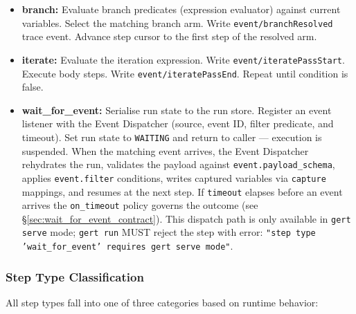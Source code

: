 \begin{itemize}
        current execution queue at \texttt{Depth+1}. The include step itself does not
        appear in the run trace; expanded steps run as if defined inline, each carrying
        an \texttt{Origin} breadcrumb: \texttt{[included from: <path>]}.
  \item \textbf{branch:} Evaluate branch predicates (expression evaluator) against current
        variables. Select the matching branch arm. Write \texttt{event/branchResolved}
        trace event. Advance step cursor to the first step of the resolved arm.
  \item \textbf{iterate:} Evaluate the iteration expression. Write
        \texttt{event/iteratePassStart}. Execute body steps. Write
        \texttt{event/iteratePassEnd}. Repeat until condition is false.
  \item \textbf{wait\_for\_event:} Serialise run state to the run store. Register an event
        listener with the Event Dispatcher (source, event ID, filter predicate, and timeout).
        Set run state to \texttt{WAITING} and return to caller — execution is suspended.
        When the matching event arrives, the Event Dispatcher rehydrates the run, validates
        the payload against \texttt{event.payload\_schema}, applies \texttt{event.filter}
        conditions, writes captured variables via \texttt{capture} mappings, and resumes
        at the next step. If \texttt{timeout} elapses before an event arrives the
        \texttt{on\_timeout} policy governs the outcome (see
        §\ref{sec:wait_for_event_contract}). This dispatch path is only available in
        \texttt{gert serve} mode; \texttt{gert run} MUST reject the step with error:
        \texttt{"step type 'wait\_for\_event' requires gert serve mode"}.
\end{itemize}

\subsubsection*{Step Type Classification}

All step types fall into one of three categories based on runtime behavior:

